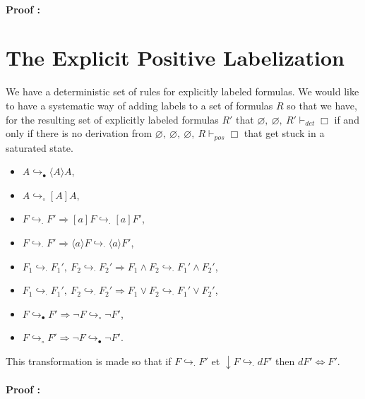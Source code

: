 \documentclass[a4paper,11pt]{article}
\newcommand{\pos}{\vdash_\mathit{pos}}
\newcommand{\dett}{\vdash_\mathit{det}}
\begin{document}
\paragraph{Proof :}

\section{The Explicit Positive Labelization}
We have a deterministic set of rules for explicitly labeled formulas. We would like to have a 
systematic way of adding labels to a set of formulas $R$ so that we have, for the resulting set of
explicitly labeled formulas $R'$ that $\varnothing,\ \varnothing,\ R'\dett\Box$ if and only if
there is no derivation from $\varnothing,\ \varnothing,\ \varnothing,\ R\pos\Box$ that get stuck
in a saturated state.
\begin{itemize}
 \item $A\hookrightarrow_\bullet\langle A\rangle A$,
 \item $A\hookrightarrow_\circ[A]A$,
 \item $F\hookrightarrow_\cdot F'\Rightarrow [a]F\hookrightarrow_\cdot[a]F'$,
 \item $F\hookrightarrow_\cdot F'\Rightarrow\langle a\rangle F\hookrightarrow_\cdot\langle a\rangle F'$,
 \item $F_1\hookrightarrow_\cdot F_1',\ F_2\hookrightarrow_\cdot F_2' \Rightarrow
F_1\wedge F_2\hookrightarrow_\cdot F_1'\wedge F_2'$,
 \item $F_1\hookrightarrow_\cdot F_1',\ F_2\hookrightarrow_\cdot F_2' \Rightarrow
F_1\vee F_2\hookrightarrow_\cdot F_1'\vee F_2'$,
 \item $F\hookrightarrow_\bullet F'\Rightarrow
\neg F \hookrightarrow_\circ \neg F'$,
 \item $F\hookrightarrow_\circ F'\Rightarrow
\neg F \hookrightarrow_\bullet \neg F'$.
\end{itemize}
This transformation is made so that if $F\hookrightarrow_\cdot F'$ et
$\downarrow F\hookrightarrow_\cdot dF'$ then $dF'\Leftrightarrow F'$.
\paragraph{Proof :}
\end{document}
